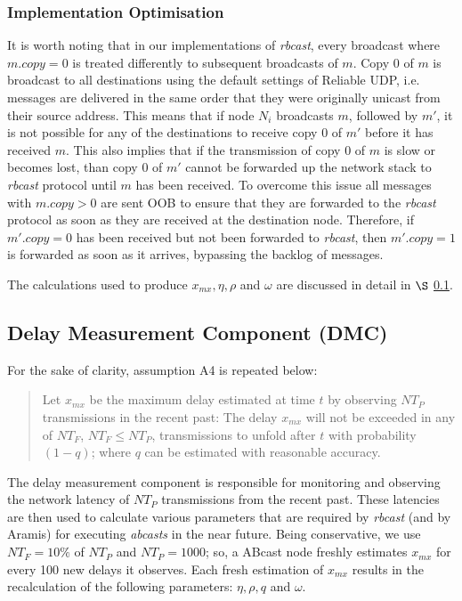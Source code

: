     \subsubsection*{Implementation Optimisation}
    It is worth noting that in our implementations of \emph{rbcast}, every broadcast where $m.copy = 0$ is treated differently to subsequent broadcasts of $m$.  Copy 0 of $m$ is broadcast to all destinations using the default settings of Reliable UDP, i.e. messages are delivered in the same order that they were originally unicast from their source address.  This means that if node $N_i$ broadcasts $m$, followed by $m'$, it is not possible for any of the destinations to receive copy $0$ of $m'$ before it has received $m$.  This also implies that if the transmission of copy $0$ of $m$ is slow or becomes lost, than copy $0$ of $m'$ cannot be forwarded up the network stack to \emph{rbcast} protocol until $m$ has been received.  To overcome this issue all messages with $m.copy > 0$ are sent OOB to ensure that they are forwarded to the \emph{rbcast} protocol as soon as they are received at the destination node.  Therefore, if $m'.copy = 0$ has been received but not been forwarded to \emph{rbcast}, then $m'.copy = 1$ is forwarded as soon as it arrives, bypassing the backlog of messages.  
    
    The calculations used to produce $x_{mx}, \eta, \rho$ and $\omega$ are discussed in detail in $\S$ \ref{ssec:dmc}.  
    
    \subsection{Delay Measurement Component (DMC)}\label{ssec:dmc}
        For the sake of clarity, assumption A4 is repeated below:   
        
        \begin{quotation}
            Let $x_{mx}$ be the maximum delay estimated at time $t$ by observing $NT_P$ transmissions in the recent past: The delay $x_{mx}$ will not be exceeded in any of $NT_F$, $NT_F \leq NT_P$, transmissions to unfold after $t$ with probability $(1 - q)$; where $q$ can be estimated with reasonable accuracy.  
        \end{quotation}
    
        The delay measurement component is responsible for monitoring and observing the network latency of $NT_P$ transmissions from the recent past.  These latencies are then used to calculate various parameters that are required by \emph{rbcast} (and by \textsf{Aramis}) for executing \emph{abcasts} in the near future.  Being conservative, we use $NT_F = 10\%$ of $NT_P$ and $NT_P=1000$; so, a \textsf{ABcast} node freshly estimates $x_{mx}$ for every 100 new delays it observes.  Each fresh estimation of $x_{mx}$ results in the recalculation of the following parameters: $\eta, \rho, q$ and $\omega$.  
        
